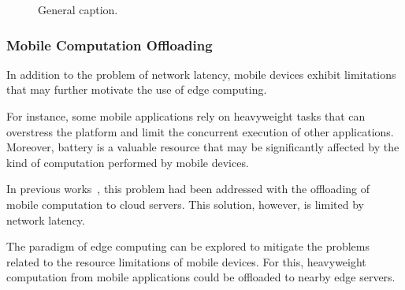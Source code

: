 \begin{figure}[htbp]
\centering
{}\hfill
{}\hfill

\caption{General caption.} \label{fig:1}
\end{figure}


\subsubsection{Mobile Computation Offloading}

In addition to the problem of network latency, mobile devices exhibit limitations that may further motivate the use of edge computing. 

For instance, some mobile applications rely on heavyweight tasks that can overstress the platform and limit the concurrent execution of other applications. Moreover, battery is a valuable resource that may be significantly affected by the kind of computation performed by mobile devices. 

In previous works~\cite{Mobile Cloud Computing}, this problem had been addressed with the offloading of mobile computation to cloud servers. This solution, however, is limited by network latency.

The paradigm of edge computing can be explored to mitigate the problems related to the resource limitations of mobile devices. For this, heavyweight computation from mobile applications could be offloaded to nearby edge servers. 

